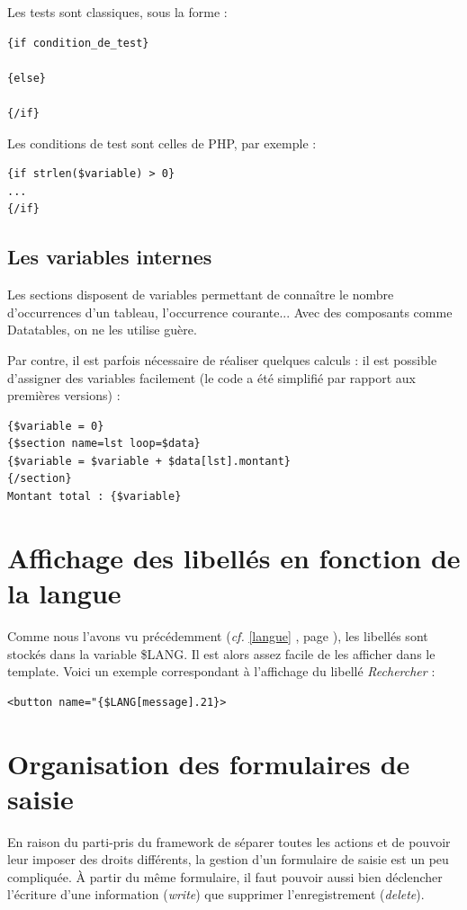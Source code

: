 Les tests sont classiques, sous la forme : 
\begin{lstlisting}
{if condition_de_test}

{else}

{/if}
\end{lstlisting}

Les conditions de test sont celles de PHP, par exemple :
\begin{lstlisting}
{if strlen($variable) > 0}
...
{/if}
\end{lstlisting}

\subsection{Les variables internes}
Les sections disposent de variables permettant de connaître le nombre d'occurrences d'un tableau, l'occurrence courante... Avec des composants comme Datatables, on ne les utilise guère.

Par contre, il est parfois nécessaire de réaliser quelques calculs : il est possible d'assigner des variables facilement (le code a été simplifié par rapport aux premières versions) :

\begin{lstlisting}
{$variable = 0}
{$section name=lst loop=$data}
{$variable = $variable + $data[lst].montant}
{/section}
Montant total : {$variable}
\end{lstlisting}

\section{Affichage des libellés en fonction de la langue}

Comme nous l'avons vu précédemment (\textit{cf.} \ref{langue} \textit{}, page \pageref{langue}), les libellés sont stockés dans la variable \$LANG. Il est alors assez facile de les afficher dans le template. Voici un exemple correspondant à l'affichage du libellé \textit{Rechercher} :
\begin{lstlisting}
<button name="{$LANG[message].21}>
\end{lstlisting}


\section{Organisation des formulaires de saisie}

En raison du parti-pris du framework de séparer toutes les actions et de pouvoir leur imposer des droits différents, la gestion d'un formulaire de saisie est un peu compliquée. À partir du même formulaire, il faut pouvoir aussi bien déclencher l'écriture d'une information (\textit{write}) que supprimer l'enregistrement (\textit{delete}). 

